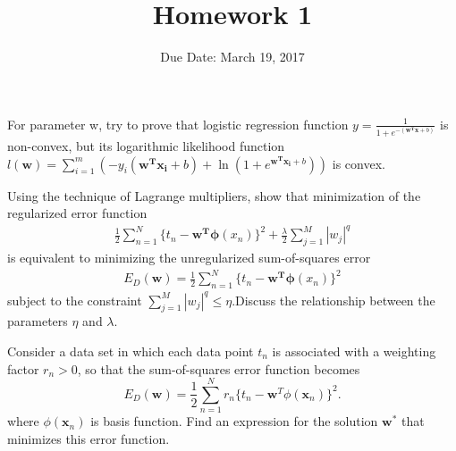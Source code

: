 \documentclass[12pt]{article}
\newenvironment{problem}[2][Problem]{\begin{trivlist}
\item[\hskip \labelsep {\bfseries #1}\hskip \labelsep {\bfseries #2.}]}{\end{trivlist}}
\begin{document}
 
 
\title{Homework 1}
\author{Due Date: March 19, 2017}
\date{}

\maketitle
 
\begin{problem}{1}
For parameter w, try to prove that logistic regression function $y=\frac{1}{1+e^{-(\bm{w^Tx}+b)}}$ is non-convex, but its logarithmic likelihood function $l(\bm{w})=\sum_{i=1}^m(-y_i(\bm{w^Tx_i}+b)+\ln(1+e^{\bm{w^Tx_i}+b}))$ is convex.
\end{problem}
 
\begin{problem}{2}
Using the technique of Lagrange multipliers, show that minimization of the regularized error function\\
\begin{align*}
\frac{1}{2}\sum_{n=1}^N\{t_n-\bm{w^T\phi}(x_n)\}^2+\frac{\lambda}{2}\sum_{j=1}^M|w_j|^q
\end{align*}
is equivalent to minimizing the unregularized sum-of-squares error\\
\begin{align*}
E_D(\bm{w})=\frac{1}{2}\sum_{n=1}^N\{t_n-\bm{w^T\phi}(x_n)\}^2
\end{align*}
subject to the constraint $\sum_{j=1}^M|w_j|^q\le \eta$.Discuss the relationship between the parameters $\eta$ and $\lambda$.
\end{problem} 

\begin{problem}{3}
Consider a data set in which each data point $t_n$ is associated with a weighting factor $r_n > 0$, so that the sum-of-squares error function becomes $$E_D(\mathbf{w}) = \frac{1}{2} \sum_{n=1}^N r_n \{t_n - \mathbf{w}^T\phi(\mathbf{x}_n)\}^2.$$ where $\phi(\mathbf{x}_n)$ is basis function.  Find an expression for the solution $\mathbf{w}^*$ that minimizes this error function. 
\end{problem}
\end{document}
